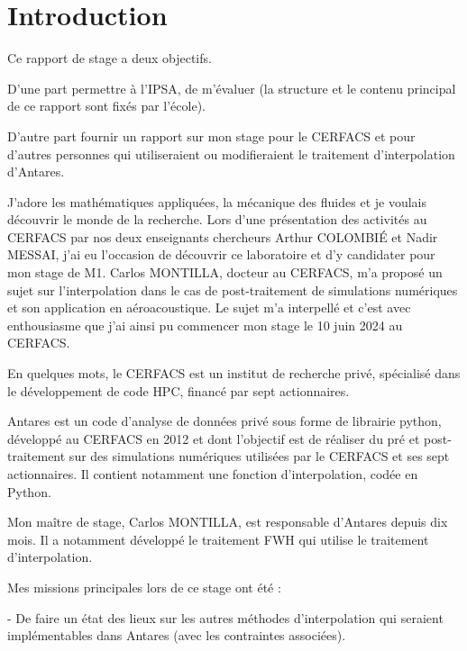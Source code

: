 \section*{Introduction}

Ce rapport de stage a deux objectifs.

D'une part permettre à l'IPSA, de m'évaluer (la structure et le contenu principal de ce rapport sont fixés par l'école).

D'autre part fournir un rapport sur mon stage pour le CERFACS et pour d'autres personnes qui utiliseraient ou modifieraient le traitement d'interpolation d'Antares.

\vspace{0.5cm}

J'adore les mathématiques appliquées, la mécanique des fluides et je voulais découvrir le monde de la recherche. Lors d'une présentation des activités au \ac{CERFACS} par nos deux enseignants chercheurs Arthur COLOMBIÉ et Nadir MESSAI, j'ai eu l'occasion de découvrir ce laboratoire et d'y candidater pour mon stage de M1. Carlos MONTILLA, docteur au CERFACS, m'a proposé un sujet sur l'interpolation dans le cas de post-traitement de simulations numériques et son application en aéroacoustique. Le sujet m'a interpellé et c'est avec enthousiasme que j'ai ainsi pu commencer mon stage le 10 juin 2024 au CERFACS.

En quelques mots, le CERFACS est un institut de recherche privé, spécialisé dans le développement de code \ac{HPC}, financé par sept actionnaires.

Antares\cite{antares} est un code d’analyse de données privé sous forme de librairie python, développé au CERFACS en 2012 et dont l'objectif est de réaliser du pré et post-traitement sur des simulations numériques utilisées par le CERFACS et ses sept actionnaires.
Il contient notamment une fonction d'interpolation, codée en Python.

Mon maître de stage, Carlos MONTILLA, est responsable d'Antares depuis dix mois. Il a notamment développé le traitement \ac{FWH} qui utilise le traitement d'interpolation.

Mes missions principales lors de ce stage ont été :

- De faire un état des lieux sur les autres méthodes d'interpolation qui seraient 
implémentables dans Antares (avec les contraintes associées).

